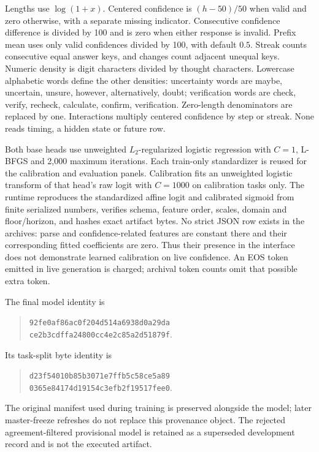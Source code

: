Lengths use \(\log(1+x)\). Centered confidence is \((h-50)/50\) when valid
and zero otherwise, with a separate missing indicator. Consecutive confidence
difference is divided by 100 and is zero when either response is invalid.
Prefix mean uses only valid confidences divided by 100, with default \(0.5\).
Streak counts consecutive equal answer keys, and changes count adjacent
unequal keys. Numeric density is digit characters divided by thought
characters. Lowercase alphabetic words define the other densities:
uncertainty words are maybe, uncertain, unsure, however, alternatively, doubt;
verification words are check, verify, recheck, calculate, confirm, verification.
Zero-length denominators are replaced by one. Interactions multiply centered
confidence by step or streak. None reads timing, a hidden state or future row.

Both base heads use unweighted \(L_2\)-regularized logistic regression with
\(C=1\), L-BFGS and 2,000 maximum iterations. Each train-only standardizer is
reused for the calibration and evaluation panels. Calibration fits an
unweighted logistic transform of that head's raw logit with \(C=1000\)
on calibration tasks only. The runtime reproduces the standardized affine
logit and calibrated sigmoid from finite serialized numbers, verifies schema,
feature order, scales, domain and floor/horizon, and hashes exact artifact bytes.
No strict JSON row exists in the archives: parse and confidence-related features
are constant there and their corresponding fitted coefficients are zero.
Thus their presence in the interface does not demonstrate learned calibration
on live confidence. An EOS token emitted in live generation is charged;
archival token counts omit that possible extra token.

The final model identity is
\begin{quote}
\texttt{92fe0af86ac0f204d514a6938d0a29da}\\
\texttt{ce2b3cdffa24800cc4e2c85a2d51879f}.
\end{quote}
Its task-split byte identity is
\begin{quote}
\texttt{d23f54010b85b3071e7ffb5c58ce5a89}\\
\texttt{0365e84174d19154c3efb2f19517fee0}.
\end{quote}
The original manifest used during training is preserved alongside the model;
later master-freeze refreshes do not replace this provenance object.
The rejected agreement-filtered provisional model is retained as a superseded
development record and is not the executed artifact.

